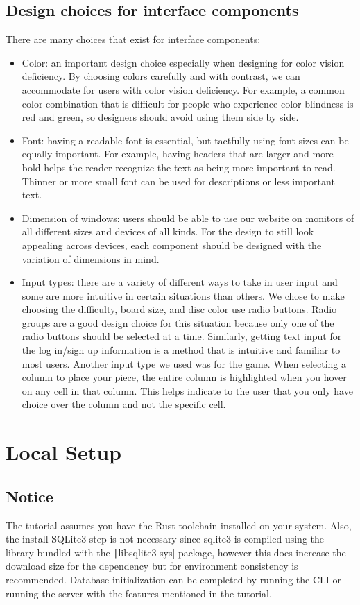 \documentclass{article}
\begin{document}
\subsection{Design choices for interface components}
There are many choices that exist for interface components:
\begin{itemize}
  \item Color: an important design choice especially when designing for color vision deficiency. By choosing colors carefully and with contrast, we can accommodate for users with color vision deficiency. For example, a common color combination that is difficult for people who experience color blindness is red and green, so designers should avoid using them side by side.
  \item Font: having a readable font is essential, but tactfully using font sizes can be equally important. For example, having headers that are larger and more bold helps the reader recognize the text as being more important to read. Thinner or more small font can be used for descriptions or less important text.
  \item Dimension of windows: users should be able to use our website on monitors of all different sizes and devices of all kinds. For the design to still look appealing across devices, each component should be designed with the variation of dimensions in mind.
  \item Input types: there are a variety of different ways to take in user input and some are more intuitive in certain situations than others. We chose to make choosing the difficulty, board size, and disc color use radio buttons. Radio groups are a good design choice for this situation because only one of the radio buttons should be selected at a time. Similarly, getting text input for the log in/sign up information is a method that is intuitive and familiar to most users. Another input type we used was for the game. When selecting a column to place your piece, the entire column is highlighted when you hover on any cell in that column. This helps indicate to the user that you only have choice over the column and not the specific cell.
\end{itemize} 

\section{Local Setup}

\subsection{Notice}
The tutorial assumes you have the Rust toolchain installed on your system.
Also, the install SQLite3 step is not necessary since sqlite3 is compiled using the library bundled with the \texttt|libsqlite3-sys| package,
however this does increase the download size for the dependency but for environment consistency is recommended.
Database initialization can be completed by running the CLI or running the server with the features mentioned in the tutorial.
\end{document}
